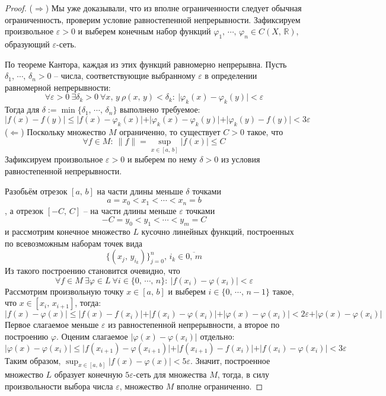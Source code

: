 \documentclass[a4paper,12pt]{article}
\renewcommand{\phi}{\ensuremath{\varphi}}
\renewcommand{\leq}{\ensuremath{\leqslant}}
\theoremstyle{plain}
\theoremstyle{definition}
\theoremstyle{remark}
\begin{document}
\begin{proof}
	($\Rightarrow$) Мы уже доказывали, что из вполне ограниченности следует обычная ограниченность, проверим условие равностепенной непрерывности. Зафиксируем произвольное $\varepsilon > 0$ и выберем конечным набор функций $\phi_1,\,\cdots,\,\phi_n \in C(X,\, \mathbb{R})$, образующий $\varepsilon$-сеть.

	По теореме Кантора, каждая из этих функций равномерно непрерывна. Пусть $\delta_1,\,\cdots,\,\delta_n > 0$ -- числа, соответствующие выбранному $\varepsilon$ в определении равномерной непрерывности:
	\[
		\forall \varepsilon > 0 \: \exists \delta_k > 0 \: \forall x,\,y \: \rho(x,\, y) < \delta_k :\: \vert\phi_k(x) -\phi_k(y)\vert < \varepsilon
	\]
	Тогда для $\delta := \min\{\delta_1,\,\cdots,\, \delta_n\}$ выполнено требуемое:
	\[
		\vert f(x) - f(y)\vert \leq \vert f(x) - \phi_k(x)\vert + \vert \phi_k(x) - \phi_k(y)\vert + \vert \phi_k(y) - f(y)\vert < 3\varepsilon
	\]
	($\Leftarrow$) Поскольку множество $M$ ограниченно, то существует $C > 0$ такое, что
	\[
    \forall f \in M :\: \|f\| = \sup_{x \in [a,\,b]} \vert f(x)\vert \leq C
	\]
  Зафиксируем произвольное $\varepsilon > 0$ и выберем по нему $\delta > 0$ из условия равностепенной непрерывности.

  Разобьём отрезок $[a,\,b]$ на части длины меньше $\delta$ точками 
  \[
    a = x_0 < x_1 < \cdots < x_n = b
  \]
  , а отрезок $[-C,\, C]$ -- на части длины меньше $\varepsilon$ точками 
  \[
    -C = y_0 < y_1 < \cdots < y_m = C
  \]
  и рассмотрим конечное множество $L$ кусочно линейных функций, построенных по всевозможным наборам точек вида
  \[
    \{(x_j,\, y_{i_k})\}_{j = 0}^n,\, i_k \in \overline{0,\,m}
  \]
  Из такого построению становится очевидно, что
  \[
    \forall f \in M \: \exists \phi \in L \: \forall i \in \{0,\,\cdots,\,n\} :\: \vert f(x_i) - \phi(x_i)\vert < \varepsilon
  \]
  Рассмотрим произвольную точку $x \in [a,\,b]$ и выберем $i \in \{0,\,\cdots,\, n-1\}$ такое, что $x \in [x_i,\, x_{i + 1}]$, тогда:
  \[
    \vert f(x) - \phi(x)\vert \leq \vert f(x) - f(x_i)\vert + \vert f(x_i) - \phi(x_i)\vert + \vert \phi(x) - \phi(x_i)\vert < 2\varepsilon + \vert \phi(x) - \phi(x_i)\vert
  \]
  Первое слагаемое меньше $\varepsilon$ из равностепенной непрерывности, а второе по построению $\phi$. Оценим слагаемое $\vert \phi(x) - \phi(x_i)\vert$ отдельно:
  \[
    \vert \phi(x) - \phi(x_i)\vert \leq \vert f(x_{i + 1}) - \phi(x_{i + 1})\vert + \vert f(x_{i + 1}) - f(x_i)\vert + \vert f(x_i) - \phi(x_i)\vert < 3\varepsilon
  \]
  Таким образом, $\sup_{x \in [a,\,b]}\vert f(x) - \phi(x)\vert < 5\varepsilon$. Значит, построенное множество $L$ образует конечную $5\varepsilon$-сеть для множества $M$, тогда, в силу произвольности выбора числа $\varepsilon$, множество $M$ вполне ограниченно.
\end{proof}
\end{document}
